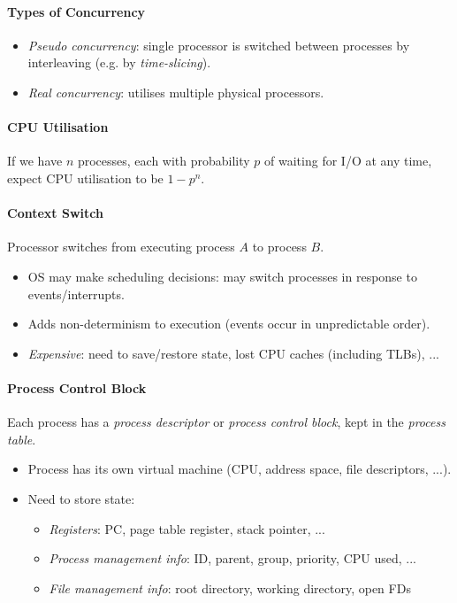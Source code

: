 \documentclass[twocolumn,english]{article}
\begin{document}
\paragraph{Types of Concurrency}
\begin{itemize}
\item \emph{Pseudo concurrency}: single processor is switched between processes
by interleaving (e.g. by \emph{time-slicing}).
\item \emph{Real concurrency}: utilises multiple physical processors.
\end{itemize}

\paragraph{CPU Utilisation}

If we have $n$ processes, each with probability $p$ of waiting for
I/O at any time, expect CPU utilisation to be $1-p^{n}$.

\paragraph{Context Switch}

Processor switches from executing process $A$ to process $B$.
\begin{itemize}
\item OS may make scheduling decisions: may switch processes in response
to events/interrupts.
\item Adds non-determinism to execution (events occur in unpredictable order).
\item \emph{Expensive}: need to save/restore state, lost CPU caches (including
TLBs), ...
\end{itemize}

\paragraph{Process Control Block}

Each process has a \emph{process descriptor} or \emph{process control
block}, kept in the \emph{process table}.
\begin{itemize}
\item Process has its own virtual machine (CPU, address space, file descriptors,
...).
\item Need to store state:
\begin{itemize}
\item \emph{Registers}: PC, page table register, stack pointer, ...
\item \emph{Process management info}: ID, parent, group, priority, CPU used,
...
\item \emph{File management info}: root directory, working directory, open
FDs
\end{itemize}
\end{itemize}
\end{document}
